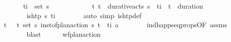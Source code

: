 \begin{isabellebody}
\ \ \ \ \isamarkupfalse%
\ {\isacharasterisk}{\kern0pt}{\isacharcolon}{\kern0pt}\ {\isachardoublequoteopen}{\isacharparenleft}{\kern0pt}t\isactrlsub i{\isacharcomma}{\kern0pt}{\isasympi}{\isacharparenright}{\kern0pt}\ {\isasymnotin}\ set\ {\isasympi}s{\isachardoublequoteclose}\isanewline
\ \ \ \ \ \ \ \ \ \ \ \ {\isachardoublequoteopen}{\isasymAnd}t\isactrlsub {\isasympi}{\isachardot}{\kern0pt}\ {\isacharparenleft}{\kern0pt}t\isactrlsub {\isasympi}{\isacharcomma}{\kern0pt}{\isasympi}{\isacharparenright}{\kern0pt}\ {\isasymin}\ durative{\isacharunderscore}{\kern0pt}acts\ {\isasympi}s\ {\isasymLongrightarrow}\ t\isactrlsub i\ {\isasymnoteq}\ t\isactrlsub {\isasympi}\ {\isacharplus}{\kern0pt}\ {\isacharparenleft}{\kern0pt}duration\ {\isasympi}{\isacharparenright}{\kern0pt}{\isachardoublequoteclose}\isanewline
\ \ \ \ \ \ \ \ \ \ {\isasympi}\isanewline
\ \ \ \ \ \ \isamarkupfalse%
\ {\isacartoucheopen}{\isasymnot}is{\isacharunderscore}{\kern0pt}htp\ {\isasympi}s\ t\isactrlsub i{\isacartoucheclose}\isanewline
\ \ \ \ \ \ \isamarkupfalse%
\ {\isacharparenleft}{\kern0pt}auto\ simp{\isacharcolon}{\kern0pt}\ is{\isacharunderscore}{\kern0pt}htp{\isacharunderscore}{\kern0pt}def{\isacharparenright}{\kern0pt}\isanewline
\ \ \ \ \isamarkupfalse%
\ t\isactrlsub {\isasympi}\ {\isasympi}\ \ {\isachardoublequoteopen}{\isacharparenleft}{\kern0pt}t\isactrlsub {\isasympi}{\isacharcomma}{\kern0pt}\ {\isasympi}{\isacharparenright}{\kern0pt}{\isasymin}set\ {\isasympi}s{\isachardoublequoteclose}\ {\isachardoublequoteopen}inst{\isacharunderscore}{\kern0pt}of{\isacharunderscore}{\kern0pt}plan{\isacharunderscore}{\kern0pt}action\ {\isasympi}s\ {\isacharparenleft}{\kern0pt}t\isactrlsub {\isasympi}{\isacharcomma}{\kern0pt}\ {\isasympi}{\isacharparenright}{\kern0pt}\ {\isacharparenleft}{\kern0pt}t\isactrlsub i{\isacharcomma}{\kern0pt}\ a{\isacharparenright}{\kern0pt}{\isachardoublequoteclose}\isanewline
\ \ \ \ \ \ \isamarkupfalse%
\ ind{\isacharunderscore}{\kern0pt}happ{\isacharunderscore}{\kern0pt}seq{\isacharunderscore}{\kern0pt}props{\isacharparenleft}{\kern0pt}{}{\isacharparenright}{\kern0pt}{\isacharbrackleft}{\kern0pt}OF\ assms{\isacharparenleft}{\kern0pt}{}{\isacharminus}{\kern0pt}{}{\isacharparenright}{\kern0pt}{\isacharbrackright}{\kern0pt}\isanewline
\ \ \ \ \ \ \isamarkupfalse%
\ blast\isanewline
\ \ \ \ \isamarkupfalse%
\ {\isachardoublequoteopen}wf{\isacharunderscore}{\kern0pt}plan{\isacharunderscore}{\kern0pt}action\ {\isasympi}{\isachardoublequoteclose}\isanewline

\end{isabellebody}
